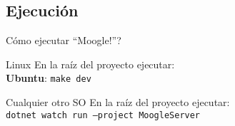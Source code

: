 \subsection{Ejecución}

\begin{frame}{\textquestiondown Cómo ejecutar ``Moogle!''?}

\begin{block}{Linux}
  En la raíz del proyecto ejecutar:\\[2mm]
  \textbf{Ubuntu}: \texttt{make dev}\\
\end{block}

\begin{block}{Cualquier otro SO}
  En la raíz del proyecto ejecutar:\\[2mm]
  \texttt{dotnet watch run --project MoogleServer}\\
\end{block}

\end{frame}
